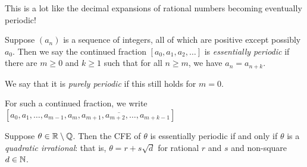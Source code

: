 \documentclass{article}
\begin{document}
This is a lot like the decimal expansions of rational numbers becoming eventually periodic!

\begin{definition}[Periodic]
    Suppose $(a_n)$ is a sequence of integers, all of which are positive except possibly $a_0$. Then we say the continued fraction $[a_0, a_1, a_2, \dots]$ is \textit{essentially periodic} if there are $m \geq 0$ and $k \geq 1$ such that for all $n \geq m$, we have $a_n = a_{n+k}$.
    
    We say that it is \textit{purely periodic} if this still holds for $m = 0$.
    
    For such a continued fraction, we write $[a_0, a_1, \dots, a_{m-1}, \overline{a_m, a_{m+1}, a_{m+2}, \dots, a_{m+k-1}}]$
\end{definition}

\begin{theorem}
	\label{lagranges-continued-fraction-theorem}
    Suppose $\theta \in \mathbb{R} \setminus \mathbb{Q}$. Then the CFE of $\theta$ is essentially periodic if and only if $\theta$ is a \textit{quadratic irrational}: that is, $\theta = r + s \sqrt{d}$ for rational $r$ and $s$ and non-square $d \in \mathbb{N}$.
\end{theorem}
\end{document}
